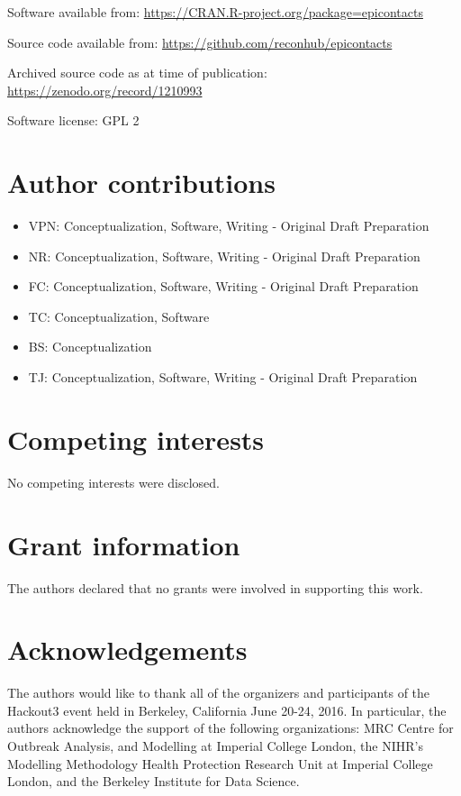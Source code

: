 \documentclass[9pt,a4paper,]{extarticle}
\theoremstyle{definition}
\theoremstyle{definition}
\theoremstyle{definition}
\theoremstyle{remark}
\begin{document}
Software available from: \url{https://CRAN.R-project.org/package=epicontacts}

Source code available from: \url{https://github.com/reconhub/epicontacts}

Archived source code as at time of publication: \url{https://zenodo.org/record/1210993}

Software license: GPL 2

\section{Author contributions}\label{author-contributions}

\begin{itemize}
\item
  VPN: Conceptualization, Software, Writing - Original Draft Preparation
\item
  NR: Conceptualization, Software, Writing - Original Draft Preparation
\item
  FC: Conceptualization, Software, Writing - Original Draft Preparation
\item
  TC: Conceptualization, Software
\item
  BS: Conceptualization
\item
  TJ: Conceptualization, Software, Writing - Original Draft Preparation
\end{itemize}

\section{Competing interests}\label{competing-interests}

No competing interests were disclosed.

\section{Grant information}\label{grant-information}

The authors declared that no grants were involved in supporting this work.

\section{Acknowledgements}\label{acknowledgements}

The authors would like to thank all of the organizers and participants of the Hackout3 event held in Berkeley, California June 20-24, 2016. In particular, the authors acknowledge the support of the following organizations: MRC Centre for Outbreak Analysis, and Modelling at Imperial College London, the NIHR's Modelling Methodology Health Protection Research Unit at Imperial College London, and the Berkeley Institute for Data Science.

{\small}
\end{document}
